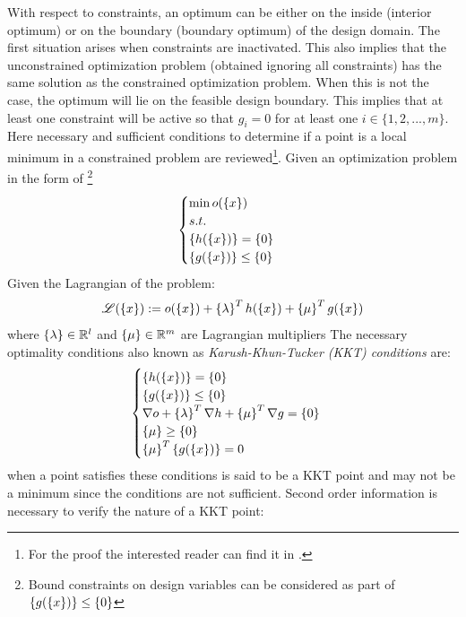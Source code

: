 With respect to constraints, an optimum can be either on the inside (interior optimum) or on the boundary (boundary optimum) of the design domain. The first situation arises when constraints are inactivated. This also implies that the unconstrained optimization problem (obtained ignoring all constraints) has the same solution as the constrained optimization problem. When this is not the case, the optimum will lie on the feasible design boundary. This implies that at least one constraint will be active so that $g_i=0$ for at least one $i\in\lbrace1,2,...,m\rbrace$. 
Here necessary and sufficient conditions to determine if a point is a local minimum in a constrained problem are reviewed\footnote{For the proof the interested reader can find it in \cite{papalambros2000principles}.}.
Given an optimization problem in the form of \footnote{Bound constraints on design variables can be considered as part of $\left\lbrace{g(\ensuremath\left\lbrace{x}\right \rbrace)}\right \rbrace\leq \left\lbrace{0}\right \rbrace$}
\begin{equation}
\begin{cases}
\min o(\left\lbrace{x}\right \rbrace)\\
s.t.\\
\left\lbrace{h(\ensuremath\left\lbrace{x}\right \rbrace)}\right \rbrace=\left\lbrace{0}\right \rbrace\\
\left\lbrace{g(\ensuremath\left\lbrace{x}\right \rbrace)}\right \rbrace\leq \left\lbrace{0}\right \rbrace
\end{cases}
\end{equation}
Given the Lagrangian of the problem:
\begin{equation}
\mathscr{L}(\left\lbrace{x}\right \rbrace):= o(\left\lbrace{x}\right \rbrace)+\left\lbrace{\lambda}\right \rbrace^T h(\left\lbrace{x}\right \rbrace)+\left\lbrace{\mu}\right \rbrace^T g(\left\lbrace{x}\right \rbrace) 
\end{equation}
where $\left\lbrace{\lambda}\right \rbrace\in \mathbb{R}^l$ and $\left\lbrace{\mu}\right \rbrace \in \mathbb{R}^m$ are Lagrangian multipliers
The necessary optimality conditions also known as \textit{Karush-Khun-Tucker (KKT) conditions} are:
\begin{equation}
\begin{cases}
\left\lbrace{h(\ensuremath\left\lbrace{x}\right \rbrace)}\right \rbrace=\left\lbrace{0}\right \rbrace\\
\left\lbrace{g(\ensuremath\left\lbrace{x}\right \rbrace)}\right \rbrace\leq \left\lbrace{0}\right \rbrace\\
\nabla o + \left\lbrace{\lambda}\right \rbrace^T\nabla h+\left\lbrace{\mu}\right \rbrace^T\nabla g=\left\lbrace{0}\right \rbrace\\
\left\lbrace{\mu}\right \rbrace\geq \left\lbrace{0}\right \rbrace\\
\left\lbrace{\mu}\right \rbrace^T\left\lbrace{g(\ensuremath\left\lbrace{x}\right \rbrace)}\right \rbrace=0
\end{cases}
\end{equation}
when a point satisfies these conditions is said to be a KKT point and may not be a minimum since the conditions are not sufficient. Second order information is necessary to verify the nature of a KKT point:\\
